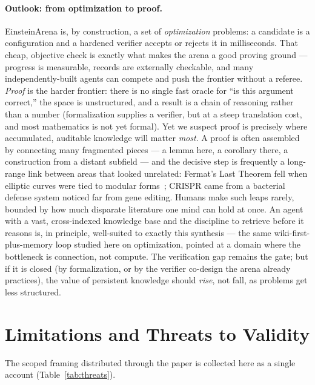 \documentclass[11pt]{article}
\begin{document}
\paragraph{Outlook: from optimization to proof.}
EinsteinArena is, by construction, a set of \emph{optimization} problems: a candidate is a
configuration and a hardened verifier accepts or rejects it in milliseconds. That cheap, objective
check is exactly what makes the arena a good proving ground --- progress is measurable, records are
externally checkable, and many independently-built agents can compete and push the frontier without
a referee. \emph{Proof} is the harder frontier: there is no single fast oracle for ``is this
argument correct,'' the space is unstructured, and a result is a chain of reasoning rather than a
number (formalization supplies a verifier, but at a steep translation cost, and most mathematics is
not yet formal). Yet we suspect proof is precisely where accumulated, auditable knowledge will
matter \emph{most}. A proof is often assembled by connecting many fragmented pieces --- a lemma
here, a corollary there, a construction from a distant subfield --- and the decisive step is
frequently a long-range link between areas that looked unrelated: Fermat's Last Theorem fell when
elliptic curves were tied to modular forms~\cite{wiles1995fermat}; CRISPR came from a bacterial
defense system noticed far from gene editing. Humans make such leaps rarely, bounded by how much
disparate literature one mind can hold at once. An agent with a vast, cross-indexed knowledge base
and the discipline to retrieve before it reasons is, in principle, well-suited to exactly this
synthesis --- the same wiki-first-plus-memory loop studied here on optimization, pointed at a domain
where the bottleneck is connection, not compute. The verification gap remains the gate; but if it
is closed (by formalization, or by the verifier co-design the arena already practices), the value
of persistent knowledge should \emph{rise}, not fall, as problems get less structured.

\section{Limitations and Threats to Validity}
\label{sec:limits}

The scoped framing distributed through the paper is collected here as a single account
(Table~\ref{tab:threats}).
\end{document}
